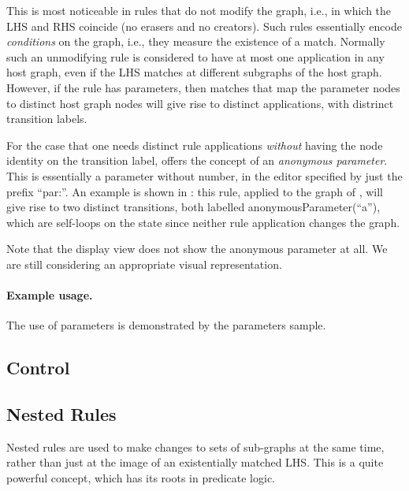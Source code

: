 This is most noticeable in rules that do not modify the graph, i.e., in which
the LHS and RHS coincide (no erasers and no creators). Such rules essentially
encode \emph{conditions} on the graph, i.e., they measure the existence of a
match. Normally such an unmodifying rule is considered to have at most one
application in any host graph, even if the LHS matches at different subgraphs of
the host graph. However, if the rule has parameters, then matches that map the
parameter nodes to distinct host graph nodes will give rise to distinct
applications, with distrinct transition labels.

For the case that one needs distinct rule applications \emph{without} having
the node identity on the transition label, \Groove{} offers the concept of an
\emph{anonymous parameter}. This is essentially a parameter without number, in
the editor specified by just the prefix ``\textsf{par:}''. An example is shown
in : this rule, applied to the graph of
, will give rise to two distinct transitions, both labelled
\textsf{anonymousParameter(``a'')}, which are self-loops on the state since
neither rule application changes the graph.

Note that the display view does not show the anonymous parameter at all. We are
still considering an appropriate visual representation.


\paragraph{Example usage.}

The use of parameters is demonstrated by the \Groove \textsf{parameters}
sample.

\subsection{Control}


\subsection{Nested Rules}

Nested rules are used to make changes to sets of sub-graphs at the same time,
rather than just at the image of an existentially matched LHS. This is a quite
powerful concept, which has its roots in predicate logic.

